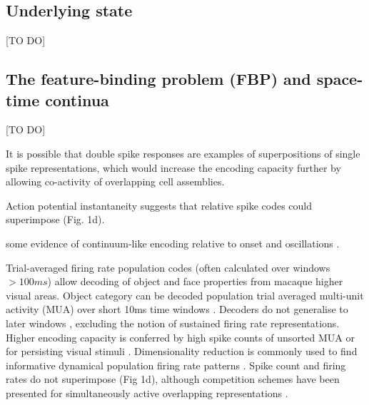 \documentclass{article}
\begin{document}
\subsection*{Underlying state}
[TO DO]


\subsection*{The feature-binding problem (FBP) and space-time continua}
[TO DO]

It is possible that double spike responses are examples of superpositions of single spike representations, which would increase the encoding capacity further by allowing co-activity of overlapping cell assemblies. 

Action potential instantaneity suggests that relative spike codes could superimpose (Fig. 1d).

some evidence of continuum-like encoding relative to onset \cite{gollisch2008rapid, storchi2012comparison} and oscillations \cite{havenith2011synchrony}.

Trial-averaged firing rate population codes (often calculated over windows $>100ms$) allow decoding of object \cite{hong2016explicit} and face \cite{chang2017code} properties from macaque higher visual areas. 
Object category can be decoded population trial averaged multi-unit activity (MUA) over short 10ms time windows \cite{kar2019evidence}. Decoders do not generalise to later windows \cite{kar2019evidence}, excluding the notion of sustained firing rate representations. Higher encoding capacity is conferred by high spike counts of unsorted MUA \cite{hong2016explicit, kar2019evidence} or for persisting visual stimuli \cite{hong2016explicit, chang2017code, kar2019evidence}. Dimensionality reduction is commonly used to find informative dynamical population firing rate patterns \cite{ahrens2012brain, mante2013context, cunningham2014dimensionality}.
Spike count and firing rates do not superimpose (Fig 1d), although competition schemes have been presented for simultaneously active overlapping representations \cite{bao2018representation}. 
\end{document}
